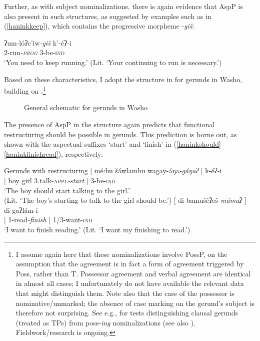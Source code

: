 \documentclass[output=paper]{langscibook}
\begin{document}
Further, as with subject nominalizations, there is again evidence that AspP is also present in such structures, as suggested by examples such as in (\ref{haninkkeep}), which contains the progressive morpheme -{\itshape giš}:

\ea\gll ʔum-lóʔc'iw{\itshape-giš} k'-éʔ-i\\
2-run\textit{\textsc{-prog}} 3-be-{\scshape ind}\\
\glt `You need to keep running.' (Lit. `Your continuing to run is necessary.') \label{haninkkeep}
\z


Based on these characteristics, I adopt the structure in  for gerunds in Washo, building on \citet{kratzer1996}.\footnote{I assume again here that these nominalizations involve PossP, on the assumption that the agreement is in fact a form of agreement triggered by Poss, rather than T. Possessor agreement and verbal agreement are identical in almost all cases; I unfortunately do not have available the relevant data that might distinguish them. Note also that the case of the possessor is nominative/unmarked; the absence of case marking on the gerund's subject is therefore not surprising. See e.g., \citet{pires2007} for tests distinguishing clausal gerunds (treated as TPs) from poss-{\itshape ing} nominalizations (see also \citealt{chomsky1970,abney1987}). Fieldwork/research is ongoing.} 

\begin{figure}
\caption{General schematic for gerunds in Washo\label{fig:haninkgerundstructure}}
\end{figure}

The presence of AspP in the structure again predicts that functional restructuring should be possible in gerunds. This prediction is borne out, as shown with the aspectual suffixes `start' and `finish' in (\ref{haninkshould}--\ref{haninkfinishread}), respectively:


\ea Gerunds with restructuring \label{haninkgerundr}
\ea\gll $[$ mé:hu šáwlamhu wagay-áŋa\textit{-gáŋaʔ} $]$ k-éʔ-i\\ 
$[$ boy girl 3.talk-{\scshape appl}{\itshape-start} $]$ 3-be-{\scshape ind}\\
\glt `The boy should start talking to the girl.'\\(Lit. `The boy's starting to talk to the girl should be.') \label{haninkshould}
\ex \label{haninkfinishread}
\gll $[$ di-bamušéʔeš\textit{-mámaʔ} $]$  di-gaʔlám-i\\
$[$ 1-read\textit{-finish} $]$ 1/3-want-{\scshape ind}\\
\glt `I want to finish reading.' (Lit. `I want my finishing to read.')
\z
\z 
\end{document}
